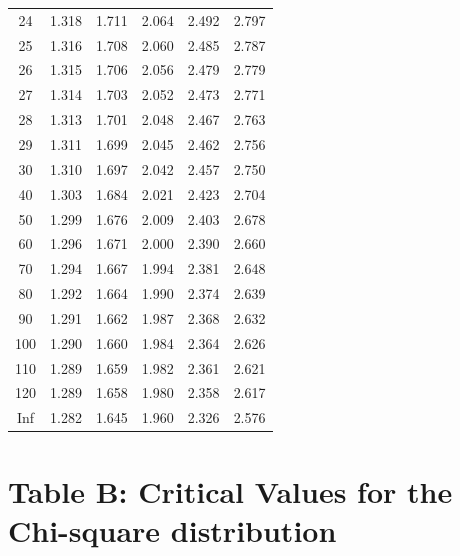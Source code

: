 \documentclass[
]{book}
\theoremstyle{definition}
\theoremstyle{definition}
\theoremstyle{definition}
\theoremstyle{definition}
\theoremstyle{remark}
\begin{document}
\begin{longtable}[]{@{}cccccc@{}}
24 & 1.318 & 1.711 & 2.064 & 2.492 & 2.797 \\
25 & 1.316 & 1.708 & 2.060 & 2.485 & 2.787 \\
26 & 1.315 & 1.706 & 2.056 & 2.479 & 2.779 \\
27 & 1.314 & 1.703 & 2.052 & 2.473 & 2.771 \\
28 & 1.313 & 1.701 & 2.048 & 2.467 & 2.763 \\
29 & 1.311 & 1.699 & 2.045 & 2.462 & 2.756 \\
30 & 1.310 & 1.697 & 2.042 & 2.457 & 2.750 \\
40 & 1.303 & 1.684 & 2.021 & 2.423 & 2.704 \\
50 & 1.299 & 1.676 & 2.009 & 2.403 & 2.678 \\
60 & 1.296 & 1.671 & 2.000 & 2.390 & 2.660 \\
70 & 1.294 & 1.667 & 1.994 & 2.381 & 2.648 \\
80 & 1.292 & 1.664 & 1.990 & 2.374 & 2.639 \\
90 & 1.291 & 1.662 & 1.987 & 2.368 & 2.632 \\
100 & 1.290 & 1.660 & 1.984 & 2.364 & 2.626 \\
110 & 1.289 & 1.659 & 1.982 & 2.361 & 2.621 \\
120 & 1.289 & 1.658 & 1.980 & 2.358 & 2.617 \\
Inf & 1.282 & 1.645 & 1.960 & 2.326 & 2.576 \\
\bottomrule()
\end{longtable}

\hypertarget{table-b-critical-values-for-the-chi-square-distribution}{%
\section*{Table B: Critical Values for the Chi-square distribution}\label{table-b-critical-values-for-the-chi-square-distribution}}
\end{document}
